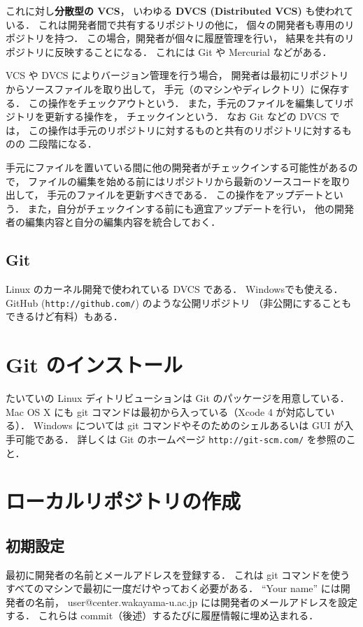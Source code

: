 \documentclass[a4j,10pt]{jarticle}
\begin{document}
これに対し{\bf 分散型の VCS}，
いわゆる {\bf DVCS (Distributed VCS)} も使われている．
これは開発者間で共有するリポジトリの他に，
個々の開発者も専用のリポジトリを持つ．
この場合，開発者が個々に履歴管理を行い，
結果を共有のリポジトリに反映することになる．
これには Git や Mercurial などがある．

VCS や DVCS によりバージョン管理を行う場合，
開発者は最初にリポジトリからソースファイルを取り出して，
手元（のマシンやディレクトリ）に保存する．
この操作をチェックアウトという．
また，手元のファイルを編集してリポジトリを更新する操作を，
チェックインという．
なお Git などの DVCS では，
この操作は手元のリポジトリに対するものと共有のリポジトリに対するものの
二段階になる．

手元にファイルを置いている間に他の開発者がチェックインする可能性があるので，
ファイルの編集を始める前にはリポジトリから最新のソースコードを取り出して，
手元のファイルを更新すべきである．
この操作をアップデートという．
また，自分がチェックインする前にも適宜アップデートを行い，
他の開発者の編集内容と自分の編集内容を統合しておく．

\subsection{Git}
Linux のカーネル開発で使われている DVCS である．
Windowsでも使える．
GitHub (\verb|http://github.com/|) のような公開リポジトリ
（非公開にすることもできるけど有料）もある．

\section{Git のインストール}
たいていの Linux ディトリビューションは Git のパッケージを用意している．
Mac OS X にも git コマンドは最初から入っている（Xcode 4 が対応している）．
Windows については git コマンドやそのためのシェルあるいは GUI が入手可能である．
詳しくは Git のホームページ \verb|http://git-scm.com/| を参照のこと．

\section{ローカルリポジトリの作成}

\subsection{初期設定}
最初に開発者の名前とメールアドレスを登録する．
これは git コマンドを使うすべてのマシンで最初に一度だけやっておく必要がある．
``Your name'' には開発者の名前，
user@center.wakayama-u.ac.jp には開発者のメールアドレスを設定する．
これらは commit（後述）するたびに履歴情報に埋め込まれる．
\end{document}
